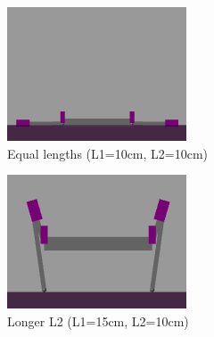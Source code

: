 \begin{figure}[h]
    \centering
    \begin{subfigure}[b]{0.32\textwidth}
        \centering
        \includegraphics[width=\textwidth]{Images/link_length_optimization/equal_len_pose.png}
        \caption{Equal lengths (L1=10cm, L2=10cm)}
    \end{subfigure}
    \hfill
    \begin{subfigure}[b]{0.32\textwidth}
        \centering
        \includegraphics[width=\textwidth]{Images/link_length_optimization/longer_L2_pose.png}
        \caption{Longer L2 (L1=15cm, L2=10cm)}
    \end{subfigure}
    \hfill
    \begin{subfigure}[b]{0.32\textwidth}

\end{subfigure}
\end{figure}
